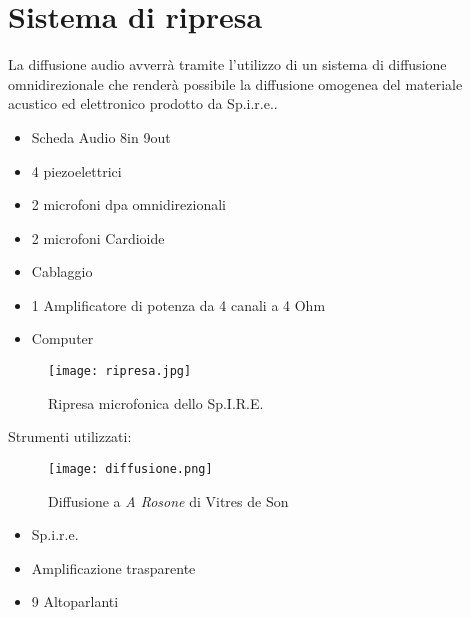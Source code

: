 \section{Sistema di ripresa}
La diffusione audio avverrà tramite l'utilizzo di un sistema di diffusione omnidirezionale che renderà possibile la diffusione omogenea del materiale acustico ed elettronico prodotto da Sp.i.r.e..

\begin{itemize}
	\item{Scheda Audio 8in 9out}
	\item{4 piezoelettrici}
	\item{2 microfoni dpa omnidirezionali}
	\item{2 microfoni Cardioide}
	\item{Cablaggio}
	\item{1 Amplificatore di potenza da 4 canali a 4 Ohm}
	\item{Computer\\}
\end{itemize}

\begin{figure}[htbp]
\begin{center}
\texttt{[image: ripresa.jpg]}
\caption{Ripresa microfonica dello Sp.I.R.E.}
\label{default}
\end{center}
\end{figure}


Strumenti utilizzati:


\begin{figure}[htbp]
\begin{center}
\texttt{[image: diffusione.png]}
\caption{Diffusione a \textit{A Rosone} di Vitres de Son}
\label{default}
\end{center}
\end{figure}

\begin{itemize}
	\item{Sp.i.r.e.}
	\item{Amplificazione trasparente}
	\item{9 Altoparlanti}
\end{itemize}

